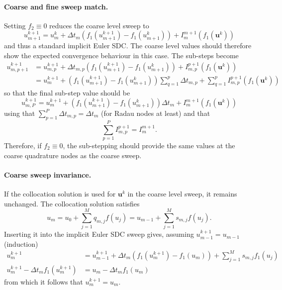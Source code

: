 \documentclass{article}
\newcommand{\ve}[1]{\mathbf{#1}}
\begin{document}
\paragraph{Coarse and fine sweep match.}
Setting $f_2 \equiv 0$ reduces the coarse level sweep to
\begin{equation}
	u^{k+1}_{m+1} = u^{k}_m + \Delta t_m \left( f_1(u^{k+1}_{m+1}) - f_1(u^k_{m+1}) \right) + I_m^{m+1}(f_1(\ve{u}^k))
\end{equation}
and thus a standard implicit Euler SDC.
The coarse level values should therefore show the expected convergence behaviour in this case.
The sub-steps become
\begin{align}
	u^{k+1}_{m,p+1} &= u^{k+1}_{m,p} + \Delta t_{m,p} \left( f_1(u^{k+1}_{m+1}) - f_1(u^{k}_{m+1}) \right) + I_{m, p}^{p+1} (f_1(\ve{u}^k)) \\
					&= u^{k+1}_m + \left( f_1(u^{k+1}_{m+1}) - f_1(u^{k}_{m+1}) \right) \sum_{q=1}^{p} \Delta t_{m,p} + \sum_{q=1}^{p} I_{m, p}^{p+1} (f_1(\ve{u}^k))
\end{align}
so that the final sub-step value should be
\begin{equation}
	u^{k+1}_{m,P} = u^{k+1}_{m} +  \left( f_1(u^{k+1}_{m+1}) - f_1(u^{k}_{m+1}) \right) \Delta t_{m} + I_m^{m+1} (f_1(\ve{u}^k))
\end{equation}
using that $\sum_{p=1}^{P} \Delta t_{m,p} = \Delta t_m$ (for Radau nodes at least) and that
\begin{equation}
	\sum_{p=1}^{P} I_{m,p}^{p+1} = I_{m}^{m+1}.
\end{equation}
Therefore, if $f_2 \equiv 0$, the sub-stepping should provide the same values at the coarse quadrature nodes as the coarse sweep.

\paragraph{Coarse sweep invariance.}
If the collocation solution is used for $\ve{u}^k$ in the coarse level sweep, it remains unchanged.
The collocation solution satisfies
\begin{equation}
	u_m = u_{0} + \sum_{j=1}^{M} q_{m,j} f(u_j) = u_{m-1} + \sum_{j=1}^{M} s_{m,j} f(u_j).		
\end{equation}
Inserting it into the implicit Euler SDC sweep gives, assuming $u^{k+1}_{m-1} = u_{m-1}$ (induction)
\begin{align}
	u^{k+1}_{m} &= u^{k+1}_{m-1} + \Delta t_m \left( f_1(u^{k+1}_m) - f_1(u_m) \right) + \sum_{j=1}^{M} s_{m,j} f_1(u_j) \\
	u^{k+1}_m - \Delta t_m f_1(u^{k+1}_{m}) &= u_m - \Delta t_m f_1(u_m)
\end{align}
from which it follows that $u^{k+1}_m = u_m$.
\end{document}
